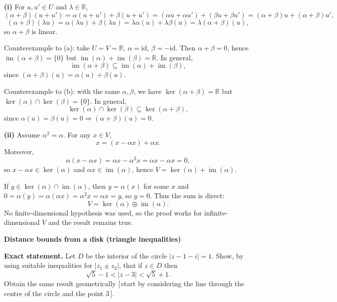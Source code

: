 \begin{solution}
\textbf{(i)} For $u,u'\in U$ and $\lambda\in\mathbb R$,
\[
(\alpha+\beta)(u+u')=\alpha(u+u')+\beta(u+u')
=(\alpha u+\alpha u')+(\beta u+\beta u')
=(\alpha+\beta)u+(\alpha+\beta)u',
\]
\[
(\alpha+\beta)(\lambda u)=\alpha(\lambda u)+\beta(\lambda u)=\lambda\alpha(u)+\lambda\beta(u)
=\lambda(\alpha+\beta)(u),
\]
so $\alpha+\beta$ is linear.

Counterexample to (a): take $U=V=\mathbb R$, $\alpha=\mathrm{id}$, $\beta=-\mathrm{id}$.
Then $\alpha+\beta=0$, hence $\operatorname{im}(\alpha+\beta)=\{0\}$ but
$\operatorname{im}(\alpha)+\operatorname{im}(\beta)=\mathbb R$.
In general,
\[
\operatorname{im}(\alpha+\beta)\subseteq \operatorname{im}(\alpha)+\operatorname{im}(\beta),
\]
since $(\alpha+\beta)(u)=\alpha(u)+\beta(u)$.

Counterexample to (b): with the same $\alpha,\beta$, we have $\ker(\alpha+\beta)=\mathbb R$ but
$\ker(\alpha)\cap\ker(\beta)=\{0\}$.
In general,
\[
\ker(\alpha)\cap\ker(\beta)\subseteq \ker(\alpha+\beta),
\]
since $\alpha(u)=\beta(u)=0\Rightarrow (\alpha+\beta)(u)=0$.

\medskip
\textbf{(ii)} Assume $\alpha^2=\alpha$.
For any $x\in V$,
\[
x=(x-\alpha x)+\alpha x.
\]
Moreover,
\[
\alpha(x-\alpha x)=\alpha x-\alpha^2 x=\alpha x-\alpha x=0,
\]
so $x-\alpha x\in\ker(\alpha)$ and $\alpha x\in\operatorname{im}(\alpha)$, hence
$V=\ker(\alpha)+\operatorname{im}(\alpha)$.

If $y\in\ker(\alpha)\cap\operatorname{im}(\alpha)$, then $y=\alpha(x)$ for some $x$ and
$0=\alpha(y)=\alpha(\alpha x)=\alpha^2 x=\alpha x=y$, so $y=0$. Thus the sum is direct:
\[
V=\ker(\alpha)\oplus\operatorname{im}(\alpha).
\]
No finite-dimensional hypothesis was used, so the proof works for infinite-dimensional $V$ and the result remains true.

\bigskip
\end{solution}

\begin{problem}[CP-I-0019]
\label{prob:cp-i-0019}
\textbf{Distance bounds from a disk (triangle inequalities)}

\textbf{Exact statement.}
\hspace*{1.5em}Let \(D\) be the interior of the circle \(|z-1-i|=1\). Show, by using suitable inequalities for \(|z_1\pm z_2|\), that
if \(z\in D\) then
\[
\sqrt5-1<|z-3|<\sqrt5+1.
\]
Obtain the same result geometrically \([\,\)start by considering the line through the centre of the circle and the point \(3\,]\).

\end{problem}

